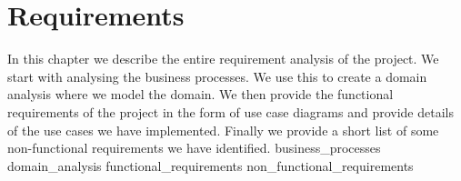 \chapter{Requirements}
In this chapter we describe the entire requirement analysis of the project. We start with analysing the business processes. We use this to create a domain analysis where we model the domain. We then provide the functional requirements of the project in the form of use case diagrams and provide details of the use cases we have implemented. Finally we provide a short list of some non-functional requirements we have identified.
{business_processes}
{domain_analysis}
{functional_requirements}
{non_functional_requirements}